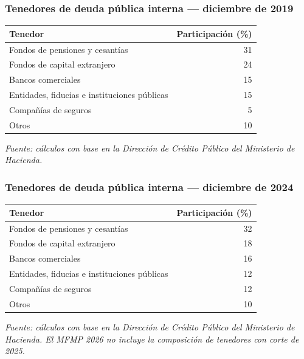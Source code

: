 \begin{frame}
  \frametitle{Tenedores de deuda pública interna — diciembre de 2019}
  \centering
  \begin{tabular}{lr}
    \toprule
    Tenedor & Participación (\%) \\
    \midrule
    Fondos de pensiones y cesantías & 31 \\
    Fondos de capital extranjero & 24 \\
    Bancos comerciales & 15 \\
    Entidades, fiducias e instituciones públicas & 15 \\
    Compañías de seguros & 5 \\
    Otros & 10 \\
    \bottomrule
  \end{tabular}

  \vfill
  \footnotesize\textit{Fuente: cálculos con base en la Dirección de Crédito Público del Ministerio de Hacienda.}
\end{frame}

\begin{frame}
  \frametitle{Tenedores de deuda pública interna — diciembre de 2024}
  \centering
  \begin{tabular}{lr}
    \toprule
    Tenedor & Participación (\%) \\
    \midrule
    Fondos de pensiones y cesantías & 32 \\
    Fondos de capital extranjero & 18 \\
    Bancos comerciales & 16 \\
    Entidades, fiducias e instituciones públicas & 12 \\
    Compañías de seguros & 12 \\
    Otros & 10 \\
    \bottomrule
  \end{tabular}

  \vfill
  \footnotesize\textit{Fuente: cálculos con base en la Dirección de Crédito Público del Ministerio de Hacienda. El MFMP 2026 no incluye la composición de tenedores con corte de 2025.}
\end{frame}